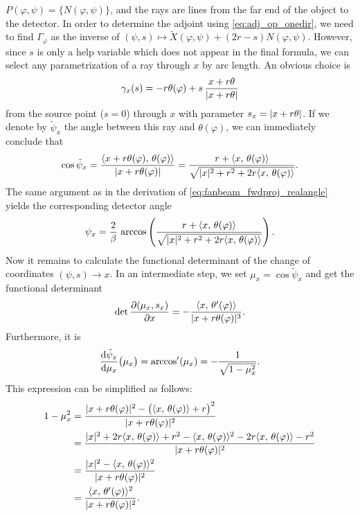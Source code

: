 \documentclass{amsart}
\renewcommand*{\phi}{\varphi}
\begin{document}
$P(\phi,\psi) = \lbrace N(\phi,\psi)\rbrace$, and the rays are lines from the far end of the object to the detector. In order to determine 
the adjoint using \eqref{eq:adj_op_onedir}, we need to find $\Gamma_\phi$ as the inverse of 
$(\psi, s) \mapsto \tilde X(\phi, \psi) + (2r - s) N(\phi,\psi)$. However, since $s$ is only a help variable which does not appear in the 
final formula, we can select any parametrization of a ray through $x$ by arc length. An obvious choice is
%
\begin{equation*}
 \gamma_x(s) = -r \theta(\phi) + s\, \frac{x + r\theta}{\ABS{x + r\theta}}
\end{equation*}
%
from the source point ($s=0$) through $x$ with parameter $s_x=|x + r\theta|$. If we denote by $\tilde\psi_x$ the angle between this 
ray and  $\theta(\phi)$, we can immediately conclude that
%
\begin{equation*}
 \cos \tilde\psi_x = \frac{\INNER{x + r\theta(\phi)}{\theta(\phi)}}{\ABS{x + r\theta(\phi)}} 
 = \frac{r + \INNER{x}{\theta(\phi)}}{\sqrt{\ABS{x}^2 + r^2 + 2r \INNER{x}{\theta(\phi)}}}.
\end{equation*}
%
The same argument as in the derivation of \eqref{eq:fanbeam_fwdproj_realangle} yields the corresponding detector angle
%
\begin{equation}
 \label{eq:fanbeam_psi_x}
 \psi_x = \frac{2}{\beta}\, \arccos\left( \frac{r + \INNER{x}{\theta(\phi)}}{\sqrt{\ABS{x}^2 + r^2 + 2r \INNER{x}{\theta(\phi)}}} \right).
\end{equation}
%
Now it remains to calculate the functional determinant of the change of coordinates $(\psi, s) \to x$. In an intermediate step, we set 
$\mu_x = \cos \tilde\psi_x$ and get the functional determinant
%
\begin{equation*}
 \DET \frac{\partial(\mu_x, s_x)}{\partial x} = - \frac{\INNER{x}{\theta'(\phi)}}{\ABS{x + r \theta(\phi)}^3}.
\end{equation*}
%
Furthermore, it is
%
\begin{equation*}
 \frac{\mathrm{d} \tilde\psi_x}{\mathrm{d} \mu_x}\big(\mu_x\big) = \arccos'(\mu_x) = - \frac{1}{\sqrt{1 - \mu_x^2}}.
\end{equation*}
%
This expression can be simplified as follows:
%
\begin{align*}
 1 - \mu_x^2 
 &= \frac{\ABS{x + r\theta(\phi)}^2 - \big(\INNER{x}{\theta(\phi)} + r\big)^2}{\ABS{x + r\theta(\phi)}^2} \\
 &= \frac{\ABS{x}^2 + 2r \INNER{x}{\theta(\phi)} + r^2 - \INNER{x}{\theta(\phi)}^2 - 2r\INNER{x}{\theta(\phi)} - r^2}{\ABS{x + 
 r\theta(\phi)}^2} \\
 &= \frac{\ABS{x}^2 - \INNER{x}{\theta(\phi)}^2}{\ABS{x + r\theta(\phi)}^2} \\
 &= \frac{\INNER{x}{\theta'(\phi)}^2}{\ABS{x + r\theta(\phi)}^2}.
\end{align*}
\end{document}
